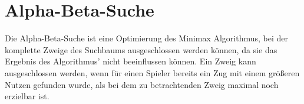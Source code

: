 \section{Alpha-Beta-Suche}

Die Alpha-Beta-Suche ist eine Optimierung des Minimax Algorithmus, bei der komplette Zweige des Suchbaums ausgeschlossen werden können, da sie das Ergebnis des Algorithmus' nicht beeinflussen können.
Ein Zweig kann ausgeschlossen werden, wenn für einen Spieler bereits ein Zug mit einem größeren Nutzen gefunden wurde, als bei dem zu betrachtenden Zweig maximal noch erzielbar ist.